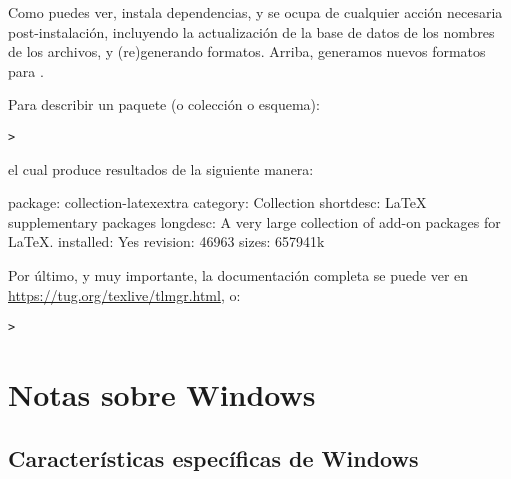 \documentclass{article}
\begin{document}
Como puedes ver,  instala dependencias, y se ocupa de
cualquier acción necesaria post-instalación, incluyendo la
actualización de la base de datos de los nombres de los archivos, y
(re)generando formatos. Arriba, generamos nuevos formatos para \XeTeX.

Para describir un paquete (o colección o esquema):
\begin{alltt}
> 
\end{alltt}
el cual produce resultados de la siguiente manera:
\begin{fverbatim}
package:    collection-latexextra
category:   Collection
shortdesc:  LaTeX supplementary packages
longdesc:   A very large collection of add-on packages for LaTeX.
installed:  Yes
revision:   46963
sizes:      657941k
\end{fverbatim}

Por último, y muy importante, la documentación completa se puede ver en
\url{https://tug.org/texlive/tlmgr.html}, o:
\begin{alltt}
> 
\end{alltt}

\section{Notas sobre Windows}
\label{sec:windows}

\subsection{Características específicas de Windows}
\label{sec:winfeatures}
\end{document}
